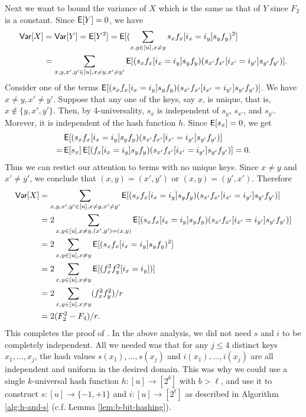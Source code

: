 Next we want to bound the variance of $X$ which is the same as
that of $Y$ since $F_2$ is a constant. Since
$\operatorname*{\sf{E}}[Y]=0$, we have
\begin{align*}
   {\sf Var}[X]&={\sf Var}[Y]=\operatorname*{\sf{E}}[Y^2]=\operatorname*{\sf{E}}[(\sum_{x,y\in[u],x\neq y}s_x f_x[i_x=i_y]s_y f_y)^2]\\
          &=\sum_{x,y,x',y'\in[u],x\neq y,x'\neq y'}\operatorname*{\sf{E}}[(s_x f_x[i_x=i_y]s_y f_y)
          (s_{x'}f_{x'}[i_{x'}=i_{y'}]s_{y'} f_{y'})].
\end{align*}
Consider one of the terms $\operatorname*{\sf{E}}[(s_x f_x[i_x=i_y]s_y f_y)
(s_{x'}f_{x'}[i_{x'}=i_{y'}]s_{y'} f_{y'})]$. We have $x\neq y,x'\neq y'$. 
Suppose that any one of the keys,
say $x$, is unique, that is, $x\not\in\{y,x',y'\}$. Then, by
4-universality, $s_x$ is independent of $s_y$, $s_{x'}$, and $s_{y'}$.
Morever, it is independent of the hash function $h$. Since $\operatorname*{\sf{E}}[s_x]=0$,
we get
\begin{align*}
&\operatorname*{\sf{E}}[(s_x f_x[i_x=i_y]s_y f_y)
(s_{x'}f_{x'}[i_{x'}=i_{y'}]s_{y'} f_{y'})] \\
   =&\operatorname*{\sf{E}}[s_x]\operatorname*{\sf{E}}[(f_x[i_x=i_y]s_y f_y) 
   (s_{x'}f_{x'}[i_{x'}=i_{y'}]s_{y'} f_{y'})]=0.
\end{align*}
Thus we can restict our attention to terms with no unique keys. 
Since $x\neq y$ and $x'\neq y'$, we conclude that 
$(x,y)=(x',y')$ or $(x,y)=(y',x')$. Therefore
\begin{align*}
   {\sf Var}[X]&=\sum_{x,y,x',y'\in[u],x\neq y,x'\neq y'}\operatorname*{\sf{E}}[(s_x f_x[i_x=i_y]s_y f_y)
   (s_{x'}f_{x'}[i_{x'}=i_{y'}]s_{y'} f_{y'})]\\
          &=2\sum_{x,y\in[u],x\neq y,(x',y')=(x,y)}\operatorname*{\sf{E}}[(s_x f_x[i_x=i_y]s_y f_y)
          (s_{x'}f_{x'}[i_{x'}=i_{y'}]s_{y'} f_{y'})]\\
          &=2\sum_{x,y\in[u],x\neq y}\operatorname*{\sf{E}}[(s_x f_x[i_x=i_y]s_y f_y)^2]\\
          &=2\sum_{x,y\in[u],x\neq y}\operatorname*{\sf{E}}[(f_x^2f_y^2[i_x=i_y])]\\
          &=2\sum_{x,y\in[u],x\neq y}(f_x^2f_y^2)/r\\
          &=2(F_2^2-F_4)/r.
\end{align*}
This completes the proof of . In the above analysis, we
did not need $s$ and $i$ to be completely independent. All we needed
was that for any $j\leq 4$ distinct keys $x_1,\ldots,x_j$, the hash
values $s(x_1),\ldots,s(x_j)$ and $i(x_1),\ldots,i(x_j)$ are all
independent and uniform in the desired domain. This was why we could
use a single $k$-universal hash function $h:[u]\to[2^b]$ with
$b>\ell$, and use it to construct $s:[u]\to\{-1,+1\}$ and
$i:[u]\to[2^\ell]$ as described in Algorithm \ref{alg:h-and-s}
(c.f. Lemma \ref{lem:b-bit-hashing}).




